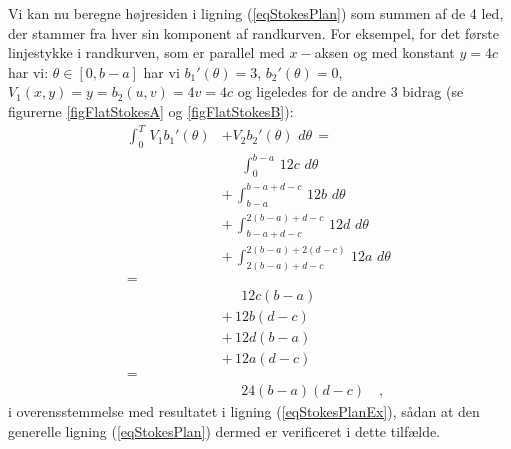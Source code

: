 \begin{example}
Vi kan nu beregne højresiden i ligning (\ref{eqStokesPlan}) som summen af de 4 led, der stammer fra hver sin komponent af randkurven. For eksempel, for det første linjestykke i randkurven, som er parallel med $x-$aksen og med konstant $y=4c$ har vi:  $\theta \in [0, b-a]$ har vi $b_{1}'(\theta) = 3$,  $b_{2}'(\theta) = 0$, $V_{1}(x,y) = y = b_{2}(u,v) = 4v = 4c$ og ligeledes for de andre 3 bidrag (se figurerne \ref{figFlatStokesA} og \ref{figFlatStokesB}):
\begin{equation}
\begin{aligned}
\int_{0}^{T} \, V_{1}b_{1}'(\theta) &+  V_{2}b_{2}'(\theta) \,\,d\theta \, = \\ \,
& \phantom{+}\, \int_{0}^{b-a} \,12c \,\,d\theta  \,  \\
& +\, \int_{b-a}^{b-a+d-c} \, 12b\,\,d\theta   \, \\
& +\, \int_{b-a+d-c}^{2(b-a)+d-c} \, 12d \,\,d\theta   \,  \\
& +\, \int_{2(b-a) + d-c }^{2(b-a) + 2(d-c) } \, 12a \,\,d\theta  \, \\ = \\
&\phantom{+}\, 12c(b-a)\\
& +\, 12b(d-c)\\
& +\, 12d(b-a)\\
& +\, 12a(d-c) \, \\ = \\
& \phantom{+}\, 24(b-a)(d-c) \quad,
\end{aligned}
\end{equation}
i overensstemmelse med resultatet i ligning (\ref{eqStokesPlanEx}), sådan at den generelle ligning (\ref{eqStokesPlan}) dermed er verificeret i dette tilfælde.

\end{example}


